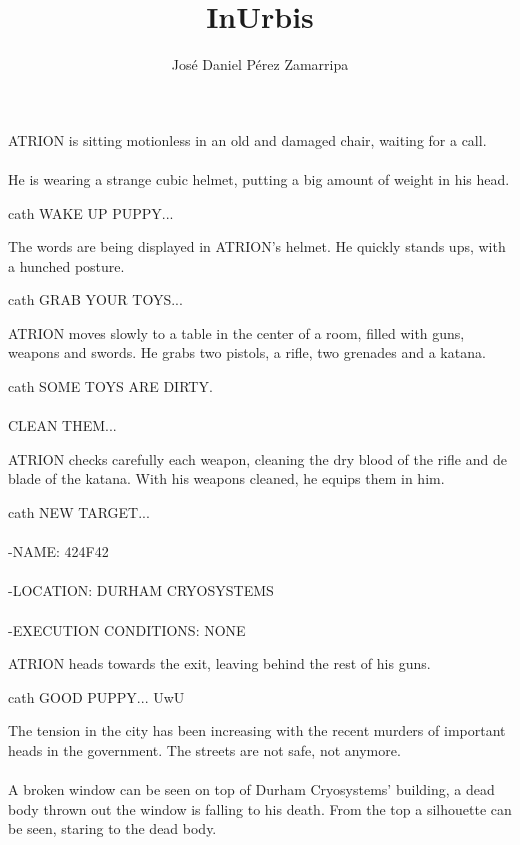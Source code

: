 \documentclass{screenplay}
\title{InUrbis}
\author{José Daniel Pérez Zamarripa}
\begin{document}
\coverpage
{}
ATRION is sitting motionless in an old and damaged chair, waiting for a call.
\\~\\
He is wearing a strange cubic helmet, putting a big amount of weight in his head. 

\begin{dialogue}{cath}
WAKE UP PUPPY...
\end{dialogue}
The words are being displayed in ATRION's helmet. He quickly stands ups, with a hunched posture.

\begin{dialogue}{cath}
GRAB YOUR TOYS... 
\end{dialogue}

ATRION moves slowly to a table in the center of a room, filled with guns, weapons and swords. He grabs two pistols, a rifle, two grenades and a katana.

\begin{dialogue}{cath}
SOME TOYS ARE DIRTY. \\~\\
CLEAN THEM...
\end{dialogue}

ATRION checks carefully each weapon, cleaning the dry blood of the rifle and de blade of the katana. With his weapons cleaned, he equips them in him.

\begin{dialogue}{cath}
NEW TARGET...
\\~\\
-NAME: 424F42
\\~\\
-LOCATION: DURHAM CRYOSYSTEMS
\\~\\
-EXECUTION CONDITIONS: NONE
\end{dialogue}

ATRION heads towards the exit, leaving behind the rest of his guns.
\begin{dialogue}{cath}
GOOD PUPPY... UwU
\end{dialogue}

The tension in the city has been increasing with the recent murders of important heads in the government. The streets are not safe, not anymore.
\\~\\
A broken window can be seen on top of Durham Cryosystems' building, a dead body thrown out the window is falling to his death. From the top a silhouette can be seen, staring to the dead body.
\end{document}
